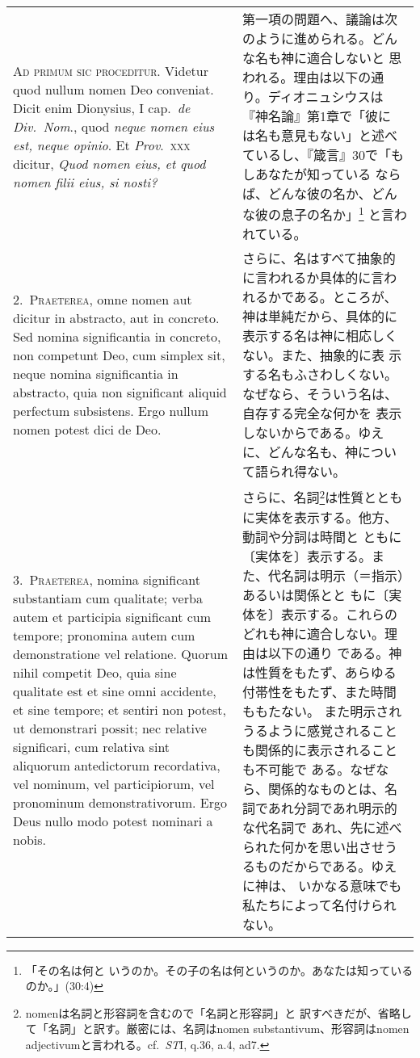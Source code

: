 \documentclass[paper=a4paper,fontsize=10pt,jafontsize=9pt,titlepage]{jlreq}
\begin{document}
\begin{longtable}{p{21em}p{21em}}

{\scshape Ad primum sic proceditur}. Videtur quod nullum nomen Deo
conveniat. Dicit enim Dionysius, I cap.\ {\itshape de Div.\ Nom}., quod
{\itshape neque nomen eius est, neque opinio}. Et {\itshape Prov}.\ {\scshape xxx}
dicitur, {\itshape Quod nomen eius, et quod nomen filii eius, si nosti?}

&

第一項の問題へ、議論は次のように進められる。どんな名も神に適合しないと
思われる。理由は以下の通り。ディオニュシウスは『神名論』第1章で「彼に
は名も意見もない」と述べているし、『箴言』30で「もしあなたが知っている
ならば、どんな彼の名か、どんな彼の息子の名か」\footnote{「その名は何と
いうのか。その子の名は何というのか。あなたは知っているのか。」(30:4)}
と言われている。

\\

2.~{\scshape Praeterea}, omne nomen aut dicitur in abstracto, aut in
concreto. Sed nomina significantia in concreto, non competunt Deo, cum
simplex sit, neque nomina significantia in abstracto, quia non
significant aliquid perfectum subsistens. Ergo nullum nomen potest
dici de Deo.

&

さらに、名はすべて抽象的に言われるか具体的に言われるかである。ところが、
神は単純だから、具体的に表示する名は神に相応しくない。また、抽象的に表
示する名もふさわしくない。なぜなら、そういう名は、自存する完全な何かを
表示しないからである。ゆえに、どんな名も、神について語られ得ない。

\\

3.~{\scshape Praeterea}, nomina significant substantiam cum qualitate;
verba autem et participia significant cum tempore; pronomina autem cum
demonstratione vel relatione. Quorum nihil competit Deo, quia sine
qualitate est et sine omni accidente, et sine tempore; et sentiri non
potest, ut demonstrari possit; nec relative significari, cum relativa
sint aliquorum antedictorum recordativa, vel nominum, vel
participiorum, vel pronominum demonstrativorum. Ergo Deus nullo modo
potest nominari a nobis.

&

さらに、名詞\footnote{nomenは名詞と形容詞を含むので「名詞と形容詞」と
訳すべきだが、省略して「名詞」と訳す。厳密には、名詞はnomen
substantivum、形容詞はnomen adjectivumと言われる。cf.~{\itshape ST}I,
q.36, a.4, ad7.}は性質とともに実体を表示する。他方、動詞や分詞は時間と
ともに〔実体を〕表示する。また、代名詞は明示（＝指示）あるいは関係とと
もに〔実体を〕表示する。これらのどれも神に適合しない。理由は以下の通り
である。神は性質をもたず、あらゆる付帯性をもたず、また時間ももたない。
また明示されうるように感覚されることも関係的に表示されることも不可能で
ある。なぜなら、関係的なものとは、名詞であれ分詞であれ明示的な代名詞で
あれ、先に述べられた何かを思い出させうるものだからである。ゆえに神は、
いかなる意味でも私たちによって名付けられない。


\end{longtable}
\end{document}
